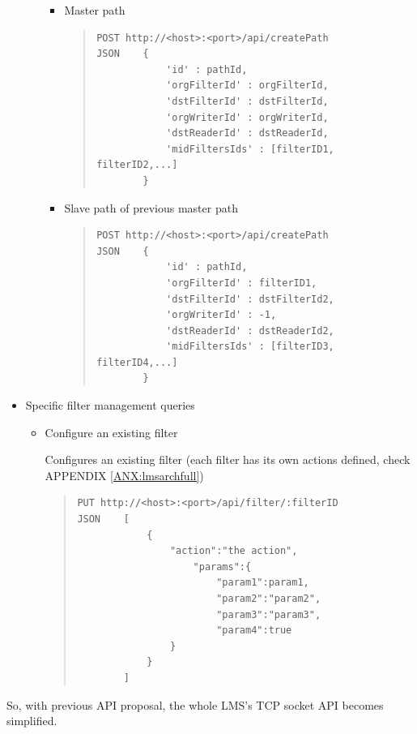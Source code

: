 \begin{itemize}
\begin{itemize}
\begin{itemize}

\item Master path
\begin{quote}
\begin{verbatim}
POST http://<host>:<port>/api/createPath
JSON    { 
            'id' : pathId, 
            'orgFilterId' : orgFilterId, 
            'dstFilterId' : dstFilterId, 
            'orgWriterId' : orgWriterId, 
            'dstReaderId' : dstReaderId, 
            'midFiltersIds' : [filterID1, filterID2,...] 
        }
\end{verbatim}
\end{quote}
\item Slave path of previous master path
\begin{quote}
\begin{verbatim}
POST http://<host>:<port>/api/createPath
JSON    { 
            'id' : pathId, 
            'orgFilterId' : filterID1, 
            'dstFilterId' : dstFilterId2, 
            'orgWriterId' : -1, 
            'dstReaderId' : dstReaderId2, 
            'midFiltersIds' : [filterID3, filterID4,...] 
        }  
\end{verbatim}
\end{quote}
\end{itemize}
\end{itemize}
\item Specific filter management queries        
\begin{itemize}
\item Configure an existing filter \hfill

Configures an existing filter (each filter has its own actions defined, check APPENDIX \ref{ANX:lmsarchfull})
\begin{quote}
\begin{verbatim}
PUT http://<host>:<port>/api/filter/:filterID
JSON    [
            {
                "action":"the action",
                    "params":{
                        "param1":param1,
                        "param2":"param2",
                        "param3":"param3",
                        "param4":true
                }
            }
        ]
\end{verbatim}
\end{quote}

\end{itemize}
\end{itemize}

So, with previous API proposal, the whole LMS's TCP socket API becomes simplified.

